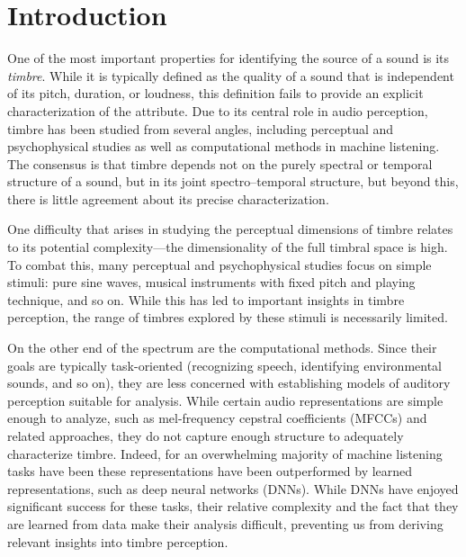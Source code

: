 \documentclass{bmcart}
\begin{document}
\section*{Introduction}
\label{sec:intro}


One of the most important properties for identifying the source of a sound is its \emph{timbre}.
While it is typically defined as the quality of a sound that is independent of its pitch, duration, or loudness, this definition fails to provide an explicit characterization of the attribute.
Due to its central role in audio perception, timbre has been studied from several angles, including perceptual and psychophysical studies as well as computational methods in machine listening.
The consensus is that timbre depends not on the purely spectral or temporal structure of a sound, but in its joint spectro--temporal structure, but beyond this, there is little agreement about its precise characterization.

One difficulty that arises in studying the perceptual dimensions of timbre relates to its potential complexity---the dimensionality of the full timbral space is high.
To combat this, many perceptual and psychophysical studies focus on simple stimuli: pure sine waves, musical instruments with fixed pitch and playing technique, and so on.
While this has led to important insights in timbre perception, the range of timbres explored by these stimuli is necessarily limited.

On the other end of the spectrum are the computational methods.
Since their goals are typically task-oriented (recognizing speech, identifying environmental sounds, and so on), they are less concerned with establishing models of auditory perception suitable for analysis.
While certain audio representations are simple enough to analyze, such as mel-frequency cepstral coefficients (MFCCs) and related approaches, they do not capture enough structure to adequately characterize timbre.
Indeed, for an overwhelming majority of machine listening tasks have been these representations have been outperformed by learned representations, such as deep neural networks (DNNs).
While DNNs have enjoyed significant success for these tasks, their relative complexity and the fact that they are learned from data make their analysis difficult, preventing us from deriving relevant insights into timbre perception.
\end{document}
